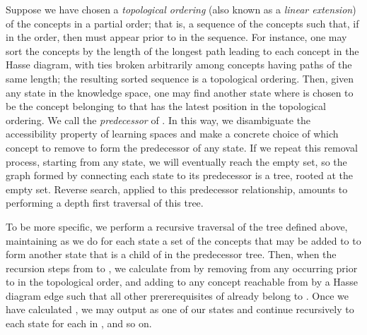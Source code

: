 \documentclass[11pt]{llncs}
\begin{document}
{Suppose we have chosen a \emph{topological ordering} (also known as a \emph{linear extension}) of the concepts in a partial order; that is,
a sequence of the concepts such that, if  in the order, then  must appear prior to  in the sequence. For instance, one may sort the concepts by the length of the longest path leading to each concept in the Hasse diagram, with ties broken arbitrarily among concepts having paths of the same length; the resulting sorted sequence is a topological ordering.
Then, given any state  in the knowledge space, one may find another state  where  is chosen to be the concept belonging to  that has the latest position in the topological ordering. We call  the \emph{predecessor} of . In this way, we disambiguate the accessibility property of learning spaces and make a concrete choice of which concept to remove to form the predecessor of any state.
If we repeat this removal process, starting from any state, we will eventually reach the empty set, so the graph formed by connecting each state to its predecessor is a tree, rooted at the empty set.
Reverse search, applied to this predecessor relationship, amounts to performing a depth first traversal of this tree.

To be more specific, we perform a recursive traversal of the tree defined above, maintaining as we do for each state  a set  of the concepts that may be added to  to form another state that is a child of  in the predecessor tree. Then, when the recursion steps from  to , we calculate  from   by removing from  any  occurring prior to  in the topological order, and adding to  any concept  reachable from  by a Hasse diagram edge  such that all other prererequisites of  already belong to .
Once we have calculated , we may output  as one of our states and continue recursively to each state  for each  in , and so on.

}
\end{document}

